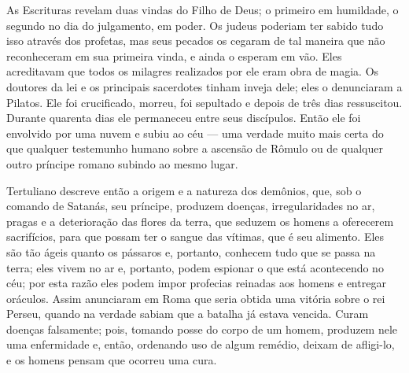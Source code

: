 \documentclass[11pt,a5paper,twoside,openany]{book}
\begin{document}
As Escrituras revelam duas vindas do Filho de Deus; o primeiro em humildade, o segundo no dia do julgamento, em poder. Os judeus poderiam ter sabido tudo isso através dos profetas, mas seus pecados os cegaram de tal maneira que não reconheceram em sua primeira vinda, e ainda o esperam em vão. Eles acreditavam que todos os milagres realizados por ele eram obra de magia. Os doutores da lei e os principais sacerdotes tinham inveja dele; eles o denunciaram a Pilatos. Ele foi crucificado, morreu, foi sepultado e depois de três dias ressuscitou. Durante quarenta dias ele permaneceu entre seus discípulos. Então ele foi envolvido por uma nuvem e subiu ao céu — uma verdade muito mais certa do que qualquer testemunho humano sobre a ascensão de Rômulo ou de qualquer outro príncipe romano subindo ao mesmo lugar.

Tertuliano descreve então a origem e a natureza dos demônios, que, sob o comando de Satanás, seu príncipe, produzem doenças, irregularidades no ar, pragas e a deterioração das flores da terra, que seduzem os homens a oferecerem sacrifícios, para que possam ter o sangue das vítimas, que é seu alimento. Eles são tão ágeis quanto os pássaros e, portanto, conhecem tudo que se passa na terra; eles vivem no ar e, portanto, podem espionar o que está acontecendo no céu; por esta razão eles podem impor profecias reinadas aos homens e entregar oráculos. Assim anunciaram em Roma que seria obtida uma vitória sobre o rei Perseu, quando na verdade sabiam que a batalha já estava vencida. Curam doenças falsamente; pois, tomando posse do corpo de um homem, produzem nele uma enfermidade e, então, ordenando uso de algum remédio, deixam de afligi-lo, e os homens pensam que ocorreu uma cura.
\end{document}
